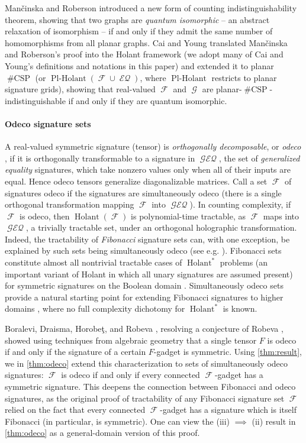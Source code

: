 \documentclass{article}
\theoremstyle{remark}
\theoremstyle{definition}
\DeclareMathOperator{\fc}{\mathcal{F}}
\DeclareMathOperator{\gc}{\mathcal{G}}
\DeclareMathOperator{\holant}{Holant}
\DeclareMathOperator{\plholant}{Pl-Holant}
\DeclareMathOperator{\csp}{\#CSP}
\DeclareMathOperator{\eq}{\mathcal{EQ}}
\DeclareMathOperator{\geneq}{\mathcal{GEQ}}
\begin{document}
Man\v{c}inska and Roberson \cite{planar} introduced a new form of counting indistinguishability
theorem, showing that two graphs are \emph{quantum isomorphic} -- an abstract relaxation of isomorphism
-- if and only if they admit the same number of homomorphisms from all planar graphs.
Cai and Young \cite{cai_planar_2023} translated Man\v{c}inska and Roberson's proof into the Holant 
framework (we adopt many of Cai and Young's definitions and notations in this paper) and extended it to 
planar $\csp$ (or $\plholant(\fc \cup \eq)$, where $\plholant$ restricts to planar signature grids), showing that real-valued $\fc$ and $\gc$ are planar-$\csp$-indistinguishable if and
only if they are quantum isomorphic.

\paragraph{Odeco signature sets}
A real-valued symmetric signature (tensor) is \emph{orthogonally decomposable}, 
or \emph{odeco} \cite{robeva}, if it is orthogonally transformable to a signature in $\geneq$, the set
of \emph{generalized equality} signatures, which take nonzero values only when all of their inputs
are equal. Hence odeco tensors generalize diagonalizable matrices.
Call a set $\fc$ of signatures odeco if the signatures are simultaneously odeco (there
is a single orthogonal transformation mapping $\fc$ into $\geneq$).
In counting complexity, if $\fc$ is odeco, then
$\holant(\fc)$ is polynomial-time tractable, as $\fc$ maps into $\geneq$, a trivially tractable set,
under an orthogonal holographic transformation.
Indeed, the tractability of \emph{Fibonacci} signature sets \cite{cai2008holographic}
can, with one exception, be explained by such 
sets being simultaneously odeco (see e.g. \cite[Section 2.2]{cai_chen_2017}). 
Fibonacci sets constitute almost all nontrivial tractable cases of $\holant^*$ problems
(an important variant of Holant in which all unary signatures are assumed 
present) for symmetric signatures on the Boolean domain \cite{cai_computational_2011}.
Simultaneously odeco
sets provide a natural starting point for extending Fibonacci signatures to higher
domains \cite{liu_2024}, where no full complexity dichotomy for $\holant^*$ is known.

Boralevi, Draisma, Horobeţ, and Robeva \cite{boralevi_orthogonal_2017}, resolving a conjecture of
Robeva \cite{robeva}, showed using techniques from algebraic geometry that a single tensor $F$ is 
odeco if and only if the signature of 
a certain $F$-gadget is symmetric. Using \autoref{thm:result}, we in \autoref{thm:odeco} extend this 
characterization to sets of simultaneously odeco signatures: $\fc$ is odeco if and only if every connected 
$\fc$-gadget has a symmetric signature. This deepens the connection between Fibonacci and odeco 
signatures, as the original proof of tractability of any Fibonacci signature set $\fc$
\cite{cai2008holographic} relied on the fact that every connected $\fc$-gadget has a signature which is
itself Fibonacci (in particular, is symmetric). 
One can view the (iii) $\implies$ (ii) result in \autoref{thm:odeco} as a general-domain version
of this proof.
\end{document}

